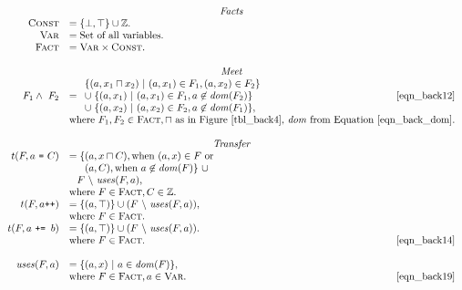 \begin{math}
  \begin{array}{rlr}

    \multicolumn{3}{c}{\emph{Facts}} \\

    \setLC &= \{\bot, \top\} \cup \ZZ.\\
    \setL{Var} &= \text{Set of all variables.} \\
    \setL{Fact} &= \setL{Var} \times \setLC. \\\\

    \multicolumn{3}{c}{\emph{Meet}} \\


    F_1 \wedge\ F_2 &= \begin{array}{l}
      \setdef{(a, x_1 \lub x_2)}{(a,x_1) \in F_1, (a,x_2) \in F_2} \\
        \cup \; \setdef{(a,x_1)}{(a,x_1) \in F_1, a \not\in \dom(F_2)} \\
        \cup \; \setdef{(a,x_2)}{(a,x_2) \in F_2, a \not\in \dom(F_1)},
    \end{array} \labeleq{eqn_back13} \labeleq{eqn_back12} & \eqref{eqn_back12} \\
    & \multicolumn{2}{l}{\ensuremath{\text{where\ } F_1, F_2 \in \setL{Fact}, \lub\ \text{as in Figure~\ref{tbl_back4},
          \mfun{dom} from Equation~\eqref{eqn_back_dom}.}}} \\\\

    \multicolumn{3}{c}{\emph{Transfer}} \\
    t (F, a\ \text{\tt =}\ C) &= \{(a, x \lub C), \text{when\ } (a, x) \in F\ \text{or} \\
    & \phantom{= \{}(a, C), \text{when\ } a \not\in \dom(F)\}\ \cup \\
    & \phantom{=} F\ \backslash\ \mfun{uses}(F, a),\\
    & \text{where\ } F \in \setL{Fact}, C \in \ZZ. \\
    t (F, a\text{\tt ++}) &= \{(a, \top)\} \cup (F\ \backslash\ \mfun{uses}(F, a)), \\
    & \text{where\ } F \in \setL{Fact}. \\
    t (F, a\ \text{\tt +=\ } b) &= \{(a, \top)\} \cup (F\ \backslash\ \mfun{uses}(F, a)). \\
    & \text{where\ } F \in \setL{Fact}. \labeleq{eqn_back14} & \eqref{eqn_back14} \\\\
    \mfun{uses}(F, a) &= \{(a, x)\ |\ a \in \dom(F)\}, \\
    & \text{where\ } F \in \setL{Fact}, a \in \setL{Var}. \labeleq{eqn_back19} & \eqref{eqn_back19} \\\\


\end{array}
\end{math}
